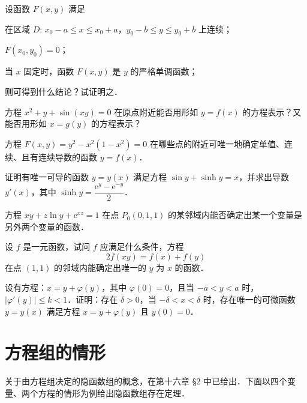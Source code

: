 \begin{xiti}
\item 设函数 $F(x,y)$ 满足
\begin{ziti}
\item 在区域 $D$: $x_{0}-a\leqslant x\leqslant x_{0}+a$，$y_{0}-b\leqslant y\leqslant y_{0}+b$ 上连续；
\item $F(x_{0},y_{0})=0$；
\item 当 $x$ 固定时，函数 $F(x,y)$ 是 $y$ 的严格单调函数；
\end{ziti}
则可得到什么结论？试证明之．
\item 方程 $x^{2}+y+\sin(xy)=0$ 在原点附近能否用形如 $y=f(x)$ 的方程表示？又能否用形如 $x=g(y)$ 的方程表示？
\item 方程 $F(x,y)=y^{2}-x^{2}(1-x^{2})=0$ 在哪些点的附近可唯一地确定单值、连续、且有连续导数的函数 $y=f(x)$．
\item 证明有唯一可导的函数 $y=y(x)$ 满足方程 $\sin y+\sinh y=x$，并求出导数 $y'(x)$，其中 $\sinh y=\dfrac{\mathrm{e}^{y}-\mathrm{e}^{-y}}{2}$．
\item 方程 $xy+z\ln y+\mathrm{e}^{xz}=1$ 在点 $P_{0}(0,1,1)$ 的某邻域内能否确定出某一个变量是另外两个变量的函数．
\item 设 $f$ 是一元函数，试问 $f$ 应满足什么条件，方程
\[
2f(xy)=f(x)+f(y)
\]
在点 $(1,1)$ 的邻域内能确定出唯一的 $y$ 为 $x$ 的函数．
\item 设有方程：$x=y+\varphi(y)$，其中 $\varphi(0)=0$，且当 $-a<y<a$ 时，$\left|\varphi'(y)\right|\leqslant k<1$．证明：存在 $\delta>0$，当 $-\delta<x<\delta$ 时，存在唯一的可微函数 $y=y(x)$ 满足方程 $x=y+\varphi(y)$ 且 $y(0)=0$．
\end{xiti}

\section{方程组的情形}

关于由方程组决定的隐函数组的概念，在第十六章 §2 中已给出．下面以四个变量、两个方程的情形为例给出隐函数组存在定理．

